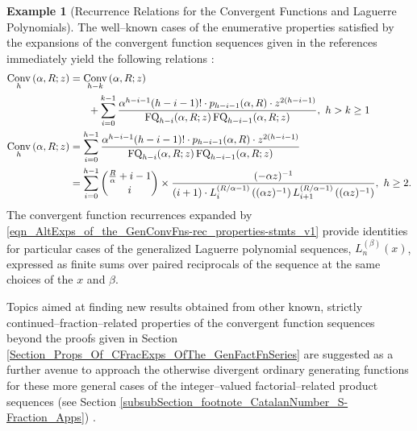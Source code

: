 \documentclass[12pt,reqno]{article}
\numberwithin{sfootnote}{section}
\numberwithin{equation}{section}
\theoremstyle{plain}
\theoremstyle{definition}
\newtheorem{example}[theorem]{Example}
\theoremstyle{remark}
\newcommand{\cf}[0]{cf.\ }
\newcommand{\ConvGF}[4]{\ensuremath{\Conv_{#1}\left(#2, #3; #4\right)}}
\DeclareMathOperator{\FQ}{FQ}
\DeclareMathOperator{\Conv}{Conv}
\begin{document}
\begin{example}[Recurrence Relations for the Convergent Functions and Laguerre Polynomials] 
The well--known cases of the enumerative properties satisfied by the 
expansions of the convergent function sequences given in the references 
immediately yield the following relations 
\citep[\S 3]{FLAJOLET80B} \citep[\S 1.12(ii)]{NISTHB}: 
\begin{align} 
\notag 
\ConvGF{h}{\alpha}{R}{z} & = 
     \ConvGF{h-k}{\alpha}{R}{z} \\ 
\notag 
     & \phantom{= \quad } + 
     \sum_{i=0}^{k-1} 
     \frac{\alpha^{h-i-1} (h-i-1)! \cdot p_{h-i-1}(\alpha, R) \cdot 
     z^{2(h-i-1)}}{ 
     \FQ_{h-i}(\alpha, R; z) \FQ_{h-i-1}(\alpha, R; z)},\ 
     h > k \geq 1 \\ 
\label{eqn_AltExps_of_the_GenConvFns-rec_properties-stmts_v1} 
\ConvGF{h}{\alpha}{R}{z} & = 
     \sum_{i=0}^{h-1} 
     \frac{\alpha^{h-i-1} (h-i-1)! \cdot p_{h-i-1}(\alpha, R) \cdot 
     z^{2(h-i-1)}}{ 
     \FQ_{h-i}(\alpha, R; z) \FQ_{h-i-1}(\alpha, R; z)} \\ 
\notag 
     & = 
     \sum_{i=0}^{h-1} \binom{\frac{R}{\alpha}+i-1}{i} \times 
     \frac{(-\alpha z)^{-1}}{(i+1) \cdot 
     L_{i}^{(R / \alpha - 1)}\left((\alpha z)^{-1}\right) 
     L_{i+1}^{(R / \alpha - 1)}\left((\alpha z)^{-1}\right)},\ 
     h \geq 2. 
\end{align} 
The convergent function recurrences expanded by 
\eqref{eqn_AltExps_of_the_GenConvFns-rec_properties-stmts_v1} 
provide identities for particular cases of the generalized 
Laguerre polynomial sequences, $L_n^{(\beta)}(x)$, 
expressed as finite sums over paired reciprocals of the 
sequence at the same choices of the $x$ and $\beta$. 
\end{example} 

Topics aimed at finding new results obtained from other known, strictly 
continued--fraction--related properties of the 
convergent function sequences beyond the proofs given in 
Section \ref{Section_Props_Of_CFracExps_OfThe_GenFactFnSeries} 
are suggested as a further avenue to approach the 
otherwise divergent ordinary generating functions for these 
more general cases of the integer--valued 
factorial--related product sequences 
(see Section \ref{subsubSection_footnote_CatalanNumber_S-Fraction_Apps}) 
\citep[\cf \S 10]{HARDYWRIGHTNUMT}. 
\end{document}
